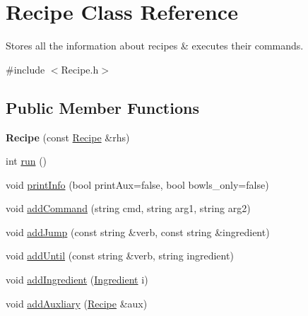 \hypertarget{classRecipe}{\section{Recipe Class Reference}
\label{classRecipe}
}


Stores all the information about recipes \& executes their commands.  




{\ttfamily \#include $<$Recipe.\-h$>$}

\subsection*{Public Member Functions}
\begin{DoxyCompactItemize}
\item 
\hypertarget{classRecipe_aab4e4187d162a84a189622dbfd60fc3a}{{\bfseries Recipe} (const \hyperlink{classRecipe}{Recipe} \&rhs)}\label{classRecipe_aab4e4187d162a84a189622dbfd60fc3a}

\item 
int \hyperlink{classRecipe_a2cec7c48e273bbedca60469f2a33bc0b}{run} ()
\item 
void \hyperlink{classRecipe_aa9a086810c68a0f459f3eded4fec249d}{print\-Info} (bool print\-Aux=false, bool bowls\-\_\-only=false)
\item 
void \hyperlink{classRecipe_a7a7be4e0b36826b23fc9e04b45320321}{add\-Command} (string cmd, string arg1, string arg2)
\item 
void \hyperlink{classRecipe_a89b9a5166511ac1bba135bb72f7f3ff5}{add\-Jump} (const string \&verb, const string \&ingredient)
\item 
void \hyperlink{classRecipe_ad70963ee27e79fc4c42ef6fdd4e064d8}{add\-Until} (const string \&verb, string ingredient)
\item 
void \hyperlink{classRecipe_a85c5fcfd5fbe1d1956e85ee1656af3a7}{add\-Ingredient} (\hyperlink{classIngredient}{Ingredient} i)
\item 
void \hyperlink{classRecipe_aa8238253913982ef70b6ea4bad997fed}{add\-Auxliary} (\hyperlink{classRecipe}{Recipe} \&aux)
\end{DoxyCompactItemize}
